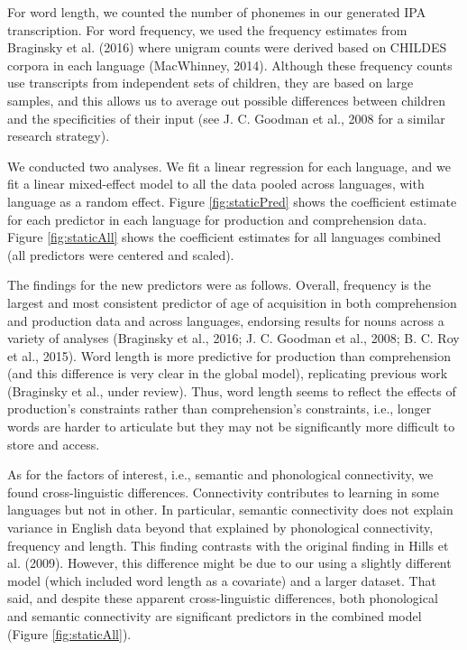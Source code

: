 \documentclass[english,floatsintext,man]{apa6}
\theoremstyle{definition}
\theoremstyle{definition}
\theoremstyle{definition}
\theoremstyle{remark}
\begin{document}
For word length, we counted the number of phonemes in our generated IPA
transcription. For word frequency, we used the frequency estimates from
Braginsky et al. (2016) where unigram counts were derived based on
CHILDES corpora in each language (MacWhinney, 2014). Although these
frequency counts use transcripts from independent sets of children, they
are based on large samples, and this allows us to average out possible
differences between children and the specificities of their input (see
J. C. Goodman et al., 2008 for a similar research strategy).

We conducted two analyses. We fit a linear regression for each language,
and we fit a linear mixed-effect model to all the data pooled across
languages, with language as a random effect. Figure \ref{fig:staticPred}
shows the coefficient estimate for each predictor in each language for
production and comprehension data. Figure \ref{fig:staticAll} shows the
coefficient estimates for all languages combined (all predictors were
centered and scaled).

The findings for the new predictors were as follows. Overall, frequency
is the largest and most consistent predictor of age of acquisition in
both comprehension and production data and across languages, endorsing
results for nouns across a variety of analyses (Braginsky et al., 2016;
J. C. Goodman et al., 2008; B. C. Roy et al., 2015). Word length is more
predictive for production than comprehension (and this difference is
very clear in the global model), replicating previous work (Braginsky et
al., under review). Thus, word length seems to reflect the effects of
production's constraints rather than comprehension's constraints, i.e.,
longer words are harder to articulate but they may not be significantly
more difficult to store and access.

As for the factors of interest, i.e., semantic and phonological
connectivity, we found cross-linguistic differences. Connectivity
contributes to learning in some languages but not in other. In
particular, semantic connectivity does not explain variance in English
data beyond that explained by phonological connectivity, frequency and
length. This finding contrasts with the original finding in Hills et al.
(2009). However, this difference might be due to our using a slightly
different model (which included word length as a covariate) and a larger
dataset. That said, and despite these apparent cross-linguistic
differences, both phonological and semantic connectivity are significant
predictors in the combined model (Figure \ref{fig:staticAll}).
\end{document}
